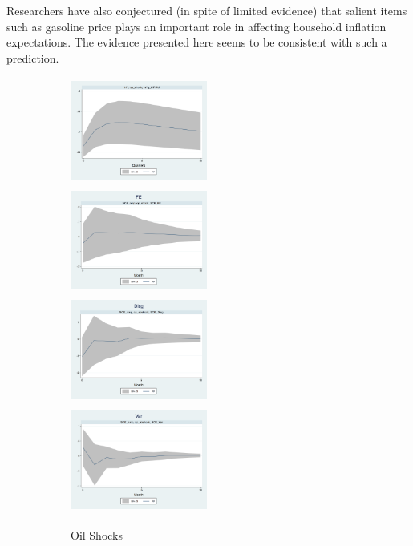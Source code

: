 \documentclass[12pt]{article}
\begin{document}
	Researchers have also conjectured (in spite of limited evidence) that salient items such as gasoline price plays an important role in affecting household inflation expectations. The evidence presented here seems to be consistent with such a prediction. 
	
	
	
	\begin{figure}[ht]
		
		\begin{subfigure}[b]{0.35\textwidth}
			\centering
			\caption{Oil Shocks}
			\includegraphics[width=4.5cm,height=3.5cm]{figures/CPIAU_ashocks_nmpM.png}
			\smallskip
			\includegraphics[width=4.5cm,height=3.5cm]{figures/SCEFE_ashocks_nmpM.png} 
			\smallskip
			\includegraphics[width=4.5cm,height=3.5cm]{figures/SCEDisg_ab_ashocks_nmpM.png}
			\smallskip
			\includegraphics[width=4.5cm,height=3.5cm]{figures/SCEVar_ab_ashocks_nmpM.png}
		\end{subfigure}
		\hfill
		\begin{subfigure}[b]{0.65\textwidth}
			\centering

\end{subfigure}
\end{figure}
\end{document}
